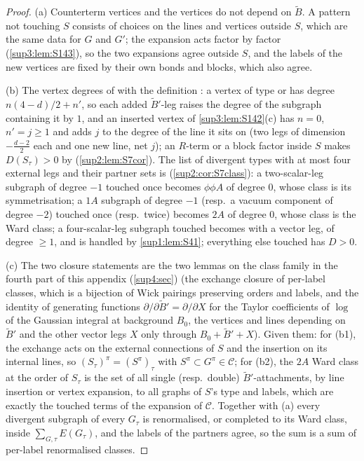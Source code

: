\begin{proof}
(a) Counterterm vertices \cite[(1.26)--(1.31)]{Ba3} and the vertices \cite[(1.6), (1.7), (1.10), (1.11)]{Ba3} do not depend on $\tilde B$. A pattern not touching $S$ consists of choices on the lines and vertices outside $S$, which are the same data for $G$ and $G'$; the expansion acts factor by factor (\cref{sup3:lem:S143}), so the two expansions agree outside $S$, and the labels of the new vertices are fixed by their own bonds and blocks, which also agree.

(b) The vertex degrees of \cite[p.~423]{Ba3} with the definition \cite[(2.2)]{Ba3}: a vertex of type \cite[(1.8)]{Ba3} or \cite[(1.10)]{Ba3} has degree $n(4-d)/2+n'$, so each added $\tilde B'$-leg raises the degree of the subgraph containing it by $1$, and an inserted vertex of \cref{sup3:lem:S142}(c) has $n=0$, $n'=j\ge1$ and adds $j$ to the degree of the line it sits on (two legs of dimension $-\frac{d-2}2$ each and one new line, net $j$); an $R$-term or a block factor inside $S$ makes $D(S_\tau)>0$ by \cite[Cor.~2.3]{Ba3} (\cref{sup2:lem:S7cor}). The list of divergent types with at most four external legs and their partner sets is \cite[pp.~429--431]{Ba3} (\cref{sup2:cor:S7class}): a two-scalar-leg subgraph of degree $-1$ touched once becomes $\phi\phi A$ of degree $0$, whose class is its symmetrisation; a $1A$ subgraph of degree $-1$ (resp.\ a vacuum component of degree $-2$) touched once (resp.\ twice) becomes $2A$ of degree $0$, whose class is the Ward class; a four-scalar-leg subgraph touched becomes \cite[(2.4)]{Ba3} with a vector leg, of degree $\ge1$, and is handled by \cref{sup1:lem:S41}; everything else touched has $D>0$.

(c) The two closure statements are the two lemmas on the class family in the fourth part of this appendix (\cref{sup4:sec}) (the exchange closure of per-label classes, which is a bijection of Wick pairings preserving orders and labels, and the identity of generating functions $\partial/\partial\tilde B'=\partial/\partial X$ for the Taylor coefficients of $\log$ of the Gaussian integral at background $B_0$, the vertices and lines depending on $\tilde B'$ and the other vector legs $X$ only through $B_0+\tilde B'+X$). Given them: for (b1), the exchange acts on the external connections of $S$ and the insertion on its internal lines, so $(S_\tau)^\pi=(S^\pi)_\tau$ with $S^\pi\subset G^\pi\in\mathcal C$; for (b2), the $2A$ Ward class at the order of $S_\tau$ is the set of all single (resp.\ double) $\tilde B'$-attachments, by line insertion or vertex expansion, to all graphs of $S$'s type and labels, which are exactly the touched terms of the expansion of $\mathcal C$. Together with (a) every divergent subgraph of every $G_\tau$ is renormalised, or completed to its Ward class, inside $\sum_{G,\tau}E(G_\tau)$, and the labels of the partners agree, so the sum is a sum of per-label renormalised classes.
\end{proof}

